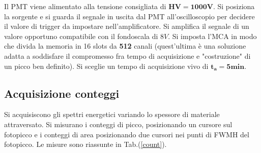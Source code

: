 \documentclass[12pt,a4paper,openright,twoside]{article}
\numberwithin{equation}{section} %
\begin{document}
Il PMT viene alimentato alla tensione consigliata di $\mathbf{HV=1000V}$.
Si posiziona la sorgente e si guarda il segnale in uscita dal PMT all'oscilloscopio per decidere il valore di trigger da impostare nell'amplificatore.
Si amplifica il segnale di un valore opportuno compatibile con il fondoscala di $8V$.
Si imposta l'MCA in modo che divida la memoria in 16 slots da \textbf{512 }canali (quest'ultima è una soluzione adatta a soddisfare il compromesso fra tempo di acquisizione e "costruzione" di un picco ben definito). Si sceglie un tempo di acquisizione vivo di {$\mathbf{t_a=5min}$}.

\pagebreak
\subsection{Acquisizione conteggi}

Si acquisiscono gli spettri energetici variando lo spessore di materiale attraversato. Si misurano i conteggi di picco, posizionando un cursore sul fotopicco e i conteggi di area posizionando due cursori nei punti di FWMH del fotopicco.
Le misure sono riassunte in Tab.(\ref{count}).
\end{document}
